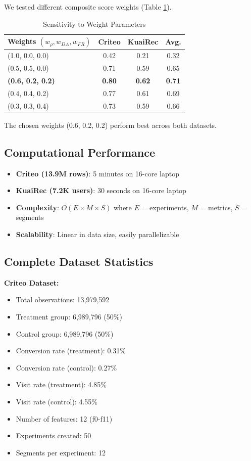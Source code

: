 \documentclass[11pt,twocolumn]{article}
\begin{document}
We tested different composite score weights (Table \ref{tab:sensitivity}).

\begin{table}[H]
\centering
\caption{Sensitivity to Weight Parameters}
\label{tab:sensitivity}
\small
\begin{tabular}{@{}lccc@{}}
\toprule
\textbf{Weights} $(w_\rho, w_{DA}, w_{FR})$ & \textbf{Criteo} & \textbf{KuaiRec} & \textbf{Avg.} \\
\midrule
(1.0, 0.0, 0.0) & 0.42 & 0.21 & 0.32 \\
(0.5, 0.5, 0.0) & 0.71 & 0.59 & 0.65 \\
\textbf{(0.6, 0.2, 0.2)} & \textbf{0.80} & \textbf{0.62} & \textbf{0.71} \\
(0.4, 0.4, 0.2) & 0.77 & 0.61 & 0.69 \\
(0.3, 0.3, 0.4) & 0.73 & 0.59 & 0.66 \\
\bottomrule
\end{tabular}
\end{table}

The chosen weights (0.6, 0.2, 0.2) perform best across both datasets.

\subsection{Computational Performance}

\begin{itemize}
    \item \textbf{Criteo (13.9M rows)}: 5 minutes on 16-core laptop
    \item \textbf{KuaiRec (7.2K users)}: 30 seconds on 16-core laptop
    \item \textbf{Complexity}: $O(E \times M \times S)$ where $E$ = experiments, $M$ = metrics, $S$ = segments
    \item \textbf{Scalability}: Linear in data size, easily parallelizable
\end{itemize}

\subsection{Complete Dataset Statistics}

\textbf{Criteo Dataset:}
\begin{itemize}
    \item Total observations: 13,979,592
    \item Treatment group: 6,989,796 (50\%)
    \item Control group: 6,989,796 (50\%)
    \item Conversion rate (treatment): 0.31\%
    \item Conversion rate (control): 0.27\%
    \item Visit rate (treatment): 4.85\%
    \item Visit rate (control): 4.55\%
    \item Number of features: 12 (f0-f11)
    \item Experiments created: 50
    \item Segments per experiment: 12
\end{itemize}
\end{document}
